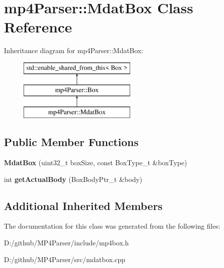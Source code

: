 \hypertarget{classmp4_parser_1_1_mdat_box}{}\section{mp4\+Parser\+::Mdat\+Box Class Reference}
\label{classmp4_parser_1_1_mdat_box}
Inheritance diagram for mp4\+Parser\+::Mdat\+Box\+:\begin{figure}[H]
\begin{center}
\leavevmode
\includegraphics[height=3.000000cm]{classmp4_parser_1_1_mdat_box}
\end{center}
\end{figure}
\subsection*{Public Member Functions}
\begin{DoxyCompactItemize}
\item 
\mbox{\label{classmp4_parser_1_1_mdat_box_a40d43c5e3be616ccc263a8e3647299ac}} 
{\bfseries Mdat\+Box} (uint32\+\_\+t box\+Size, const Box\+Type\+\_\+t \&box\+Type)
\item 
\mbox{\label{classmp4_parser_1_1_mdat_box_a8b45d77b076c55399164a6fa2d065ade}} 
int {\bfseries get\+Actual\+Body} (Box\+Body\+Ptr\+\_\+t \&body)
\end{DoxyCompactItemize}
\subsection*{Additional Inherited Members}


The documentation for this class was generated from the following files\+:\begin{DoxyCompactItemize}
\item 
D\+:/github/\+M\+P4\+Parser/include/mp4box.\+h\item 
D\+:/github/\+M\+P4\+Parser/src/mdatbox.\+cpp\end{DoxyCompactItemize}
